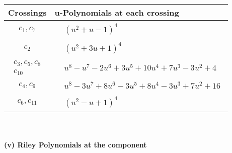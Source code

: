 \documentclass[1p]{elsarticle_modified}
\theoremstyle{definition}
\begin{document}
\begin{tabular}{m{50pt}|m{274pt}}
Crossings & \hspace{64pt}u-Polynomials at each crossing \\
\hline $$\begin{aligned}c_{1},c_{7}\end{aligned}$$&$\begin{aligned}
&(u^2+u-1)^4
\end{aligned}$\\
\hline $$\begin{aligned}c_{2}\end{aligned}$$&$\begin{aligned}
&(u^2+3 u+1)^4
\end{aligned}$\\
\hline $$\begin{aligned}c_{3},c_{5},c_{8}\\c_{10}\end{aligned}$$&$\begin{aligned}
&u^8- u^7-2 u^6+3 u^5+10 u^4+7 u^3-3 u^2+4
\end{aligned}$\\
\hline $$\begin{aligned}c_{4},c_{9}\end{aligned}$$&$\begin{aligned}
&u^8-3 u^7+8 u^6-3 u^5+8 u^4-3 u^3+7 u^2+16
\end{aligned}$\\
\hline $$\begin{aligned}c_{6},c_{11}\end{aligned}$$&$\begin{aligned}
&(u^2- u+1)^4
\end{aligned}$\\
\hline
\end{tabular}\\~\\
\newpage\renewcommand{\arraystretch}{1}
\flushleft \textbf{(v) Riley Polynomials at the component}\newline \\
\end{document}
